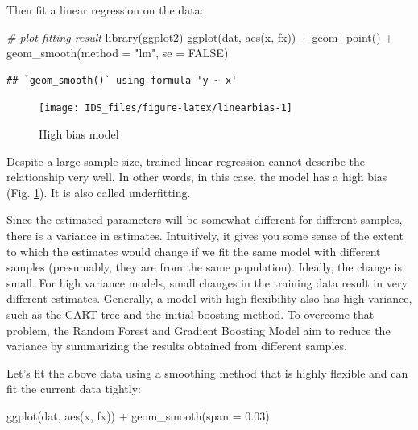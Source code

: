 \documentclass[
  12pt,
]{krantz}
\makeatletter
\newenvironment{Shaded}{\begin{snugshade}}{\end{snugshade}}
\newcommand{\AttributeTok}[1]{\textcolor[rgb]{0.61,0.61,0.61}{#1}}
\newcommand{\CommentTok}[1]{\textcolor[rgb]{0.37,0.37,0.37}{\textit{#1}}}
\newcommand{\ConstantTok}[1]{\textcolor[rgb]{0,0,0}{#1}}
\newcommand{\FloatTok}[1]{\textcolor[rgb]{0.06,0.06,0.06}{#1}}
\newcommand{\FunctionTok}[1]{\textcolor[rgb]{0,0,0}{#1}}
\newcommand{\NormalTok}[1]{#1}
\newcommand{\SpecialCharTok}[1]{\textcolor[rgb]{0,0,0}{#1}}
\newcommand{\StringTok}[1]{\textcolor[rgb]{0.5,0.5,0.5}{#1}}
\newenvironment{kframe}{%
\medskip{}
\setlength{\fboxsep}{.8em}
 \def\at@end@of@kframe{}%
 \ifinner\ifhmode%
  \def\at@end@of@kframe{\end{minipage}}%
  \begin{minipage}{\columnwidth}%
 \fi\fi%
 \def\FrameCommand##1{\hskip\@totalleftmargin \hskip-\fboxsep
 \colorbox{shadecolor}{##1}\hskip-\fboxsep
     \hskip-\linewidth \hskip-\@totalleftmargin \hskip\columnwidth}%
 \MakeFramed {\advance\hsize-\width
   \@totalleftmargin\z@ \linewidth\hsize
   \@setminipage}}%
 {\par\unskip\endMakeFramed%
 \at@end@of@kframe}
\renewenvironment{Shaded}{\begin{kframe}}{\end{kframe}}
\makeatother
\begin{document}
Then fit a linear regression on the data:

\begin{Shaded}
\begin{Highlighting}[]
\CommentTok{\# plot fitting result}
\FunctionTok{library}\NormalTok{(ggplot2)}
\FunctionTok{ggplot}\NormalTok{(dat, }\FunctionTok{aes}\NormalTok{(x, fx)) }\SpecialCharTok{+} 
    \FunctionTok{geom\_point}\NormalTok{() }\SpecialCharTok{+} 
    \FunctionTok{geom\_smooth}\NormalTok{(}\AttributeTok{method =} \StringTok{"lm"}\NormalTok{, }\AttributeTok{se =} \ConstantTok{FALSE}\NormalTok{)}
\end{Highlighting}
\end{Shaded}

\begin{verbatim}
## `geom_smooth()` using formula 'y ~ x'
\end{verbatim}

\begin{figure}

{\centering \texttt{[image: IDS\_files/figure-latex/linearbias-1]} 

}

\caption{High bias model}\label{fig:linearbias}
\end{figure}

Despite a large sample size, trained linear regression cannot describe the relationship very well. In other words, in this case, the model has a high bias (Fig. \ref{fig:linearbias}). It is also called underfitting.

Since the estimated parameters will be somewhat different for different samples, there is a variance in estimates. Intuitively, it gives you some sense of the extent to which the estimates would change if we fit the same model with different samples (presumably, they are from the same population). Ideally, the change is small. For high variance models, small changes in the training data result in very different estimates. Generally, a model with high flexibility also has high variance, such as the CART tree and the initial boosting method. To overcome that problem, the Random Forest and Gradient Boosting Model aim to reduce the variance by summarizing the results obtained from different samples.

Let's fit the above data using a smoothing method that is highly flexible and can fit the current data tightly:

\begin{Shaded}
\begin{Highlighting}[]
\FunctionTok{ggplot}\NormalTok{(dat, }\FunctionTok{aes}\NormalTok{(x, fx)) }\SpecialCharTok{+} \FunctionTok{geom\_smooth}\NormalTok{(}\AttributeTok{span =} \FloatTok{0.03}\NormalTok{)}
\end{Highlighting}
\end{Shaded}
\end{document}
